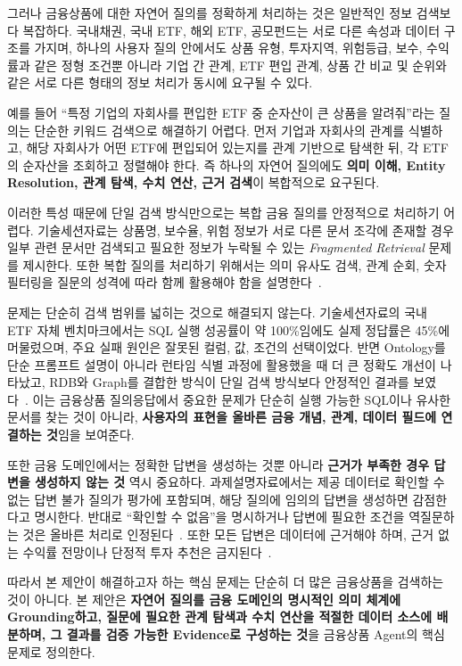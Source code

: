 \documentclass[11pt,a4paper]{article}
\begin{document}
그러나 금융상품에 대한 자연어 질의를 정확하게 처리하는 것은
일반적인 정보 검색보다 복잡하다.
국내채권, 국내 ETF, 해외 ETF, 공모펀드는
서로 다른 속성과 데이터 구조를 가지며,
하나의 사용자 질의 안에서도
상품 유형, 투자지역, 위험등급, 보수, 수익률과 같은 정형 조건뿐 아니라
기업 간 관계, ETF 편입 관계, 상품 간 비교 및 순위와 같은
서로 다른 형태의 정보 처리가 동시에 요구될 수 있다.

예를 들어
``특정 기업의 자회사를 편입한 ETF 중 순자산이 큰 상품을 알려줘''라는 질의는
단순한 키워드 검색으로 해결하기 어렵다.
먼저 기업과 자회사의 관계를 식별하고,
해당 자회사가 어떤 ETF에 편입되어 있는지를 관계 기반으로 탐색한 뒤,
각 ETF의 순자산을 조회하고 정렬해야 한다.
즉 하나의 자연어 질의에도
\textbf{의미 이해, Entity Resolution, 관계 탐색, 수치 연산, 근거 검색}이
복합적으로 요구된다.

이러한 특성 때문에 단일 검색 방식만으로는
복합 금융 질의를 안정적으로 처리하기 어렵다.
기술세션자료는 상품명, 보수율, 위험 정보가 서로 다른 문서 조각에 존재할 경우
일부 관련 문서만 검색되고 필요한 정보가 누락될 수 있는
\textit{Fragmented Retrieval} 문제를 제시한다.
또한 복합 질의를 처리하기 위해서는
의미 유사도 검색, 관계 순회, 숫자 필터링을
질문의 성격에 따라 함께 활용해야 함을 설명한다~\cite[19--21쪽]{mirae-tech}.

문제는 단순히 검색 범위를 넓히는 것으로 해결되지 않는다.
기술세션자료의 국내 ETF 자체 벤치마크에서는
SQL 실행 성공률이 약 100\%임에도 실제 정답률은 45\%에 머물렀으며,
주요 실패 원인은 잘못된 컬럼, 값, 조건의 선택이었다.
반면 Ontology를 단순 프롬프트 설명이 아니라
런타임 식별 과정에 활용했을 때 더 큰 정확도 개선이 나타났고,
RDB와 Graph를 결합한 방식이 단일 검색 방식보다 안정적인 결과를 보였다~\cite[23쪽]{mirae-tech}.
이는 금융상품 질의응답에서 중요한 문제가
단순히 실행 가능한 SQL이나 유사한 문서를 찾는 것이 아니라,
\textbf{사용자의 표현을 올바른 금융 개념, 관계, 데이터 필드에 연결하는 것}임을 보여준다.

또한 금융 도메인에서는 정확한 답변을 생성하는 것뿐 아니라
\textbf{근거가 부족한 경우 답변을 생성하지 않는 것} 역시 중요하다.
과제설명자료에서는 제공 데이터로 확인할 수 없는 답변 불가 질의가
평가에 포함되며, 해당 질의에 임의의 답변을 생성하면 감점한다고 명시한다.
반대로 ``확인할 수 없음''을 명시하거나
답변에 필요한 조건을 역질문하는 것은 올바른 처리로 인정된다~\cite[7쪽]{mirae-task}.
또한 모든 답변은 데이터에 근거해야 하며,
근거 없는 수익률 전망이나 단정적 투자 추천은 금지된다~\cite[6쪽]{mirae-task}.

따라서 본 제안이 해결하고자 하는 핵심 문제는
단순히 더 많은 금융상품을 검색하는 것이 아니다.
본 제안은
\textbf{자연어 질의를 금융 도메인의 명시적인 의미 체계에 Grounding하고,
질문에 필요한 관계 탐색과 수치 연산을 적절한 데이터 소스에 배분하며,
그 결과를 검증 가능한 Evidence로 구성하는 것}을
금융상품 Agent의 핵심 문제로 정의한다.
\end{document}
